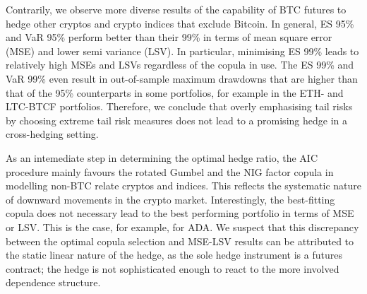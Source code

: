 \documentclass[11pt,a4paper,english]{article}
\providecommand{\natp}[1]{\textcolor{darkorange}{#1}}
\begin{document}
Contrarily, we observe more diverse results of the capability of BTC
futures to hedge other cryptos and crypto indices that exclude Bitcoin. 
In general, ES 95\% and VaR 95\% perform better than their 99\%
in terms of mean square error (MSE) and lower semi variance (LSV).
In particular, minimising ES 99\% leads to relatively
high MSEs and LSVs regardless of the copula in use. The ES 99\% and
VaR 99\% even result in out-of-sample maximum drawdowns that are
higher than that of the 95\% counterparts in some portfolios, 
for example in the ETH- and LTC-BTCF portfolios.
Therefore, we conclude that overly emphasising tail risks by choosing
extreme tail risk measures does not lead to a promising hedge in a
cross-hedging setting. 

As an intemediate step in determining the optimal hedge ratio, 
the AIC procedure mainly favours the rotated Gumbel and the NIG
factor copula in modelling non-BTC relate cryptos and indices. This
reflects the systematic nature of 
downward movements in the crypto market. Interestingly, the best-fitting
copula does not necessary lead to the best performing portfolio in
terms of MSE or LSV. This is the case, for example, for ADA. 
We suspect that this discrepancy between the optimal copula selection and
MSE-LSV results can be attributed to the static linear nature of the
hedge, as the sole hedge instrument is a futures contract; the
hedge is not sophisticated enough to react to the more involved
dependence structure.


\end{document}
